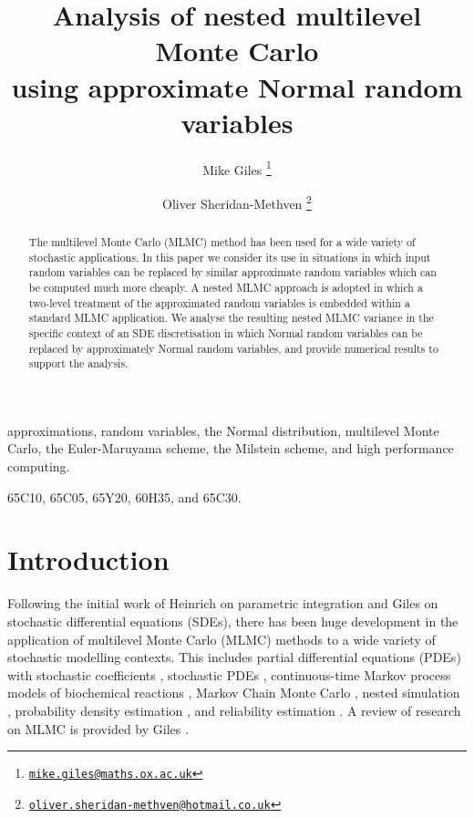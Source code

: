 \documentclass[review]{siamart190516}
\begin{document}
\title{Analysis of nested multilevel Monte Carlo \\ using approximate Normal random variables}

\author{
Mike Giles
\thanks{\href{mailto:mike.giles@maths.ox.ac.uk}%
{\texttt{mike.giles@maths.ox.ac.uk}}}
\and 
Oliver Sheridan-Methven
\thanks{\href{mailto:oliver.sheridan-methven@hotmail.co.uk}%
{\texttt{oliver.sheridan-methven@hotmail.co.uk}}}
}

\maketitle

\begin{abstract}
The multilevel Monte Carlo (MLMC) method has been used for a wide variety
of stochastic applications.  In this paper we consider its use in situations
in which input random variables can be replaced by similar approximate random
variables which can be computed much more cheaply.  A nested MLMC approach is
adopted in which a two-level treatment of the approximated random variables
is embedded within a standard MLMC application. We analyse the resulting
nested MLMC variance in the specific context of an SDE discretisation in
which Normal random variables can be replaced by approximately Normal
random variables, and provide numerical results to support the analysis.
\end{abstract}

\begin{keywords}
approximations, random variables, the Normal distribution, multilevel Monte Carlo, the Euler-Maruyama scheme, the Milstein scheme, and high performance computing.
\end{keywords}

\begin{AMS}
65C10, 65C05, 65Y20, 60H35, and 65C30.
\end{AMS}


\section{Introduction}

Following the initial work of Heinrich \cite{heinrich98} on parametric
integration and Giles \cite{giles08} on stochastic differential equations
(SDEs), there has been huge development in the application of multilevel
Monte Carlo (MLMC) methods to a wide variety of stochastic modelling
contexts. This includes partial differential equations (PDEs) with
stochastic coefficients \cite{cgst11,bsz11}, stochastic PDEs \cite{gr12},
continuous-time Markov process models of biochemical reactions
\cite{ah12,ahs14},
Markov Chain Monte Carlo \cite{hss13,sst17},
nested simulation \cite{bhr15,gg19},
probability density estimation \cite{gnr15,bc16},
and reliability estimation \cite{up15,ehm16}.
A review of research on MLMC is provided by Giles \cite{giles15}.
\end{document}
